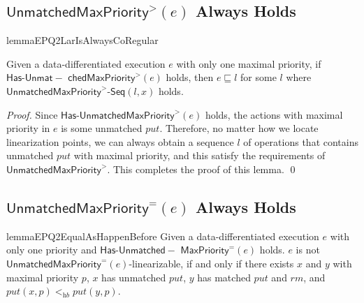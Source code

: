 \subsection{$\mathsf{UnmatchedMaxPriority}^{>}(e)$ Always Holds}
\label{subsec:appendix co-regular of EPQ2Lar}


\begin{restatable}{lemma}{EPQ2LarIsAlwaysCoRegular}
\label{lemma:EPQ2Lar is always co-regular}

Given a data-differentiated execution $e$ with only one maximal priority, if $\mathsf{Has\text{-}}\mathsf{Unmat-}$ $\mathsf{chedMaxPriority}^{>}(e)$ holds, then $e \sqsubseteq l$ for some $l$ where $\mathsf{UnmatchedMaxPriority}^{>}\mathsf{\text{-}Seq}(l,x)$ holds. 
\end{restatable}

\begin {proof}
Since $\mathsf{Has\text{-}}\mathsf{UnmatchedMaxPriority}^{>}(e)$ holds, the actions with maximal priority in $e$ is some unmatched $\textit{put}$. Therefore, no matter how we locate linearization points, we can always obtain a sequence $l$ of operations that contains unmatched $\textit{put}$ with maximal priority, and this satisfy the requirements of $\mathsf{UnmatchedMaxPriority}^{>}$. This completes the proof of this lemma. \qed
\end {proof}




\subsection{$\mathsf{UnmatchedMaxPriority}^{=}(e)$ Always Holds}
\label{subsec:appendix co-regular of EPQ2Equal}

\begin{restatable}{lemma}{EPQ2EqualAsHappenBefore}
\label{lemma:EPQ2Equal as happen before}
Given a data-differentiated execution $e$ with only one priority and $\mathsf{Has\text{-}}\mathsf{Unmatched-}$ $\mathsf{MaxPriority}^{=}(e)$ holds. $e$ is not $\mathsf{UnmatchedMaxPriority}^{=}(e)$-linearizable, if and only if there exists $x$ and $y$ with maximal priority $p$, $x$ has unmatched $\textit{put}$, $y$ has matched $\textit{put}$ and $\textit{rm}$, and $\textit{put}(x,p) <_{\textit{hb}} \textit{put}(y,p)$.
\end{restatable}

